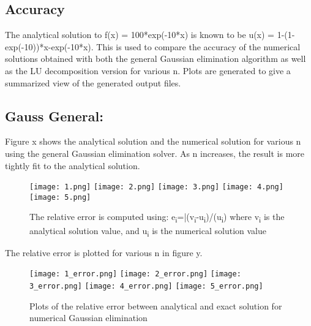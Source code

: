 \documentclass[12pt]{article}
\begin{document}
\subsection{Accuracy}
The analytical solution to f(x) = 100*exp(-10*x) is known to be u(x) = 1-(1-exp(-10))*x-exp(-10*x). This is used to compare the accuracy of the numerical solutions obtained with both the general Gaussian elimination algorithm as well as the LU decomposition version for various n.  Plots are generated to give a summarized view of the generated output files.\\

\subsection{Gauss General:}
Figure x shows the analytical solution and the numerical solution for various n using the general Gaussian elimination solver. As n increases, the result is more tightly fit to the analytical solution.\\

\begin{figure}[H]
\graphicspath{ {c:/Users/charl/Documents/Precision/Gauss/}{C:/Users/Mike/Documents/GitHub/sayboltm/PHY480/Project1/Report/Precision/Gauss/}}
\texttt{[image: 1.png]}
\texttt{[image: 2.png]}
\texttt{[image: 3.png]}
\texttt{[image: 4.png]}
\centering
\texttt{[image: 5.png]}\\
\centering
\caption{The relative error is computed using:
	e\textsubscript{i}=|(v\textsubscript{i}-u\textsubscript{i})/(u\textsubscript{i})
	where v\textsubscript{i} is the analytical solution value, and u\textsubscript{i} is the numerical solution value}
\end{figure}
The relative error is plotted for various n in figure y.\\
\begin{figure}[H]
\centering
\graphicspath{ {c:/Users/charl/Documents/Precision/Gauss/}{C:/Users/Mike/Documents/GitHub/sayboltm/PHY480/Project1/Report/Precision/Gauss/}}
\texttt{[image: 1\_error.png]}
\texttt{[image: 2\_error.png]}
\texttt{[image: 3\_error.png]}
\texttt{[image: 4\_error.png]}
\centering
\texttt{[image: 5\_error.png]}\\
\centering
\caption{ Plots of the relative error between analytical and exact solution for numerical Gaussian elimination}
\end{figure}
\end{document}
